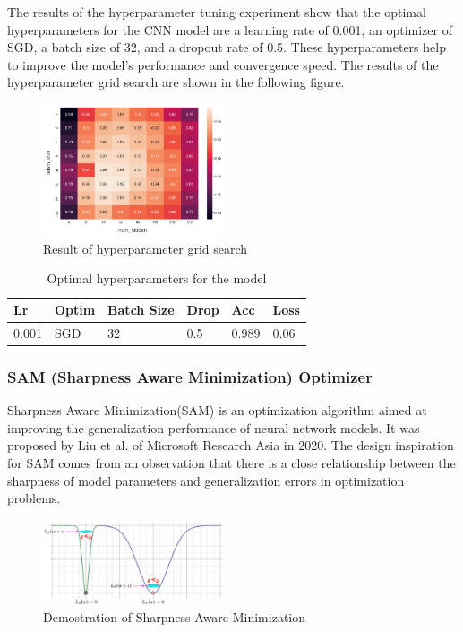 \documentclass[twocolumn]{article}
\begin{document}
    The results of the hyperparameter tuning experiment show that the optimal hyperparameters for the CNN model are a learning rate of 0.001, an optimizer of SGD, a batch size of 32, and a dropout rate of 0.5. These hyperparameters help to improve the model's performance and convergence speed. The results of the hyperparameter grid search are shown in the following figure.

    \begin{figure}[ht]
        \centering
        \includegraphics[width=0.48\textwidth]{grid_heatmap.png}
        \caption{Result of hyperparameter grid search}
        \label{fig:grid_heatmap}
    \end{figure}

    \begin{table}[ht]
        \begin{tabular}{|l|l|l|l|l|l|}
        \hline
        Lr & Optim & Batch Size & Drop & Acc & Loss \\ \hline
        0.001 & SGD & 32 & 0.5 & 0.989 & 0.06 \\ \hline
        \end{tabular}
        \caption{Optimal hyperparameters for the model}
        \label{tab:hyperparameters}
    \end{table}


    \subsubsection{SAM (Sharpness Aware Minimization) Optimizer}

    Sharpness Aware Minimization(SAM) is an optimization algorithm aimed at improving the generalization performance of neural network models. It was proposed by Liu et al\cite{foret2021sharpnessaware}. of Microsoft Research Asia in 2020. The design inspiration for SAM comes from an observation that there is a close relationship between the sharpness of model parameters and generalization errors in optimization problems.
    
    \begin{figure}[ht]
        \centering
        \includegraphics[width=0.48\textwidth]{SAM.png}
        \caption{Demostration of Sharpness Aware Minimization}
        \label{fig:SAM}
    \end{figure}
\end{document}
